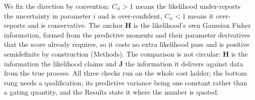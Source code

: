We fix the direction by convention: $C_{ii}>1$ means the likelihood under-reports the uncertainty in
parameter $i$ and is over-confident, $C_{ii}<1$ means it over-reports and is conservative. The
anchor $\mathbf{H}$ is the likelihood's own Gaussian Fisher information, formed from the predictive
moments and their parameter derivatives that the score already requires, so it costs no extra
likelihood pass and is positive semidefinite by construction (Methods). The comparison
is not circular: $\mathbf{H}$ is the information the likelihood claims and $\mathbf{J}$ the information
it delivers against data from the true process. All three checks run on the whole cost ladder; the
bottom rung needs a qualification, its predictive variance being one constant rather than a gating
quantity, and the Results state it where the number is quoted.

